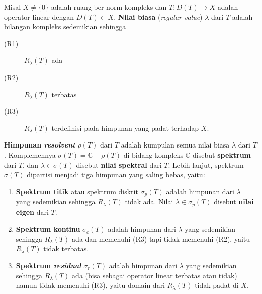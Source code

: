 \begin{definition} \citep{Diesche} \label{definisi:nilairegular}
	Misal $X \neq \{0\}$ adalah ruang ber-norm kompleks dan $T:D(T) \longrightarrow X$ adalah operator linear dengan $D(T) \subset X$.  \textbf{Nilai biasa} (\textit{regular value}) $\lambda$ dari $T$ adalah bilangan kompleks sedemikian sehingga\vspace*{-0.25cm}
	\begin{description}
		\item[(R1)] $R_{\lambda}(T)$ ada\vspace*{-0.25cm}
		\item[(R2)] $R_{\lambda}(T)$ terbatas\vspace*{-0.25cm}
		\item[(R3)] $R_{\lambda}(T)$ terdefinisi pada himpunan yang padat terhadap $X$.\vspace*{-0.25cm}
	\end{description}
	\textbf{Himpunan \textit{resolvent}} $\rho (T)$ dari $T$ adalah kumpulan semua nilai biasa $\lambda$ dari $T$.
	Komplemennya $\sigma (T)=\mathbb{C}-\rho (T)$ di bidang kompleks $\mathbb{C}$ disebut \textbf{spektrum} dari $T$, dan $\lambda \in \sigma (T)$ disebut \textbf{nilai spektral} dari $T$. Lebih lanjut, spektrum $\sigma (T)$ dipartisi menjadi tiga himpunan yang saling bebas, yaitu:
	\begin{enumerate}\vspace*{-0.25cm}
		\item \textbf{Spektrum titik} atau spektrum diskrit $\sigma_p (T)$ adalah himpunan dari $\lambda$ yang sedemikian sehingga $R_\lambda (T)$ tidak ada. Nilai $\lambda \in \sigma_p (T)$ disebut \textbf{nilai eigen} dari $T$.\vspace*{-0.25cm}
		\item \textbf{Spektrum kontinu} $\sigma_c (T)$ adalah himpunan dari $\lambda$ yang sedemikian sehingga $R_\lambda (T)$ ada dan memenuhi (R3) tapi tidak memenuhi (R2), yaitu $R_\lambda (T)$ tidak terbatas.\vspace*{-0.25cm}
		\item \textbf{Spektrum \textit{residual}} $\sigma_r (T)$ adalah himpunan dari $\lambda$ yang sedemikian sehingga $R_\lambda (T)$ ada (bisa sebagai operator linear terbatas atau tidak) namun tidak memenuhi (R3), yaitu domain dari $R_\lambda (T)$ tidak padat di $X$.\vspace*{-0.25cm}
	\end{enumerate}
\end{definition}

